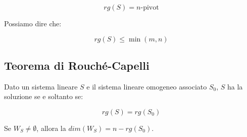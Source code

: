 \documentclass{subfiles}
\begin{document}
$$
rg(S) = n\text{-pivot}
$$

\noindent
Possiamo dire che:

$$
rg(S) \leq \min(m, n)
$$

\subsection{Teorema di Rouché-Capelli}

Dato un sistema lineare $S$ e il sistema lineare omogeneo associato $S_0$, $S$ ha la soluzione se e soltanto se:

$$
rg(S) = rg(S_0)
$$

\noindent
Se $W_S \neq \emptyset$, allora la $dim(W_S) = n - rg(S_0)$.
\end{document}
